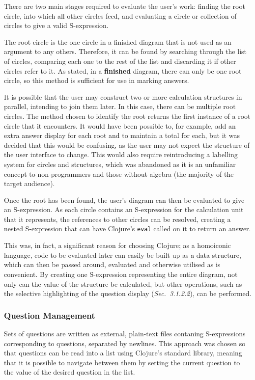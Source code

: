 \documentclass[12pt,twoside,notitlepage,xetex]{report}
\begin{document}
There are two main stages required to evaluate the user's work: finding the root circle, into which all other circles feed, and evaluating a circle or collection of circles to give a valid S-expression.

The root circle is the one circle in a finished diagram that is not used as an argument to any others.  Therefore, it can be found by searching through the list of circles, comparing each one to the rest of the list and discarding it if other circles refer to it.  As stated, in a {\bf finished} diagram, there can only be one root circle, so this method is sufficient for use in marking answers.

It is possible that the user may construct two or more calculation structures in parallel, intending to join them later.  In this case, there can be multiple root circles.  The method chosen to identify the root returns the first instance of a root circle that it encounters.  It would have been possible to, for example, add an extra answer display for each root and to maintain a total for each, but it was decided that this would be confusing, as the user may not expect the structure of the user interface to change.  This would also require reintroducing a labelling system for circles and structures, which was abandoned as it is an unfamiliar concept to non-programmers and those without algebra (the majority of the target audience).

Once the root has been found, the user's diagram can then be evaluated to give an S-expression.  As each circle contains an S-expression for the calculation unit that it represents, the references to other circles can be resolved, creating a nested S-expression that can have Clojure's \verb¬eval¬ called on it to return an answer.

This was, in fact, a significant reason for choosing Clojure; as a homoiconic language, code to be evaluated later can easily be built up as a data structure, which can then be passed around, evaluated and otherwise utilised as is convenient.  By creating one S-expression representing the entire diagram, not only can the value of the structure be calculated, but other operations, such as the selective highlighting of the question display (\emph{Sec.~3.1.2.2}), can be performed.

\subsubsection{Question Management}

Sets of questions are written as external, plain-text files contaning S-expressions corresponding to questions, separated by newlines.  This approach was chosen so that questions can be read into a list using Clojure's standard library, meaning that it is possible to navigate between them by setting the current question to the value of the desired question in the list.
\end{document}
